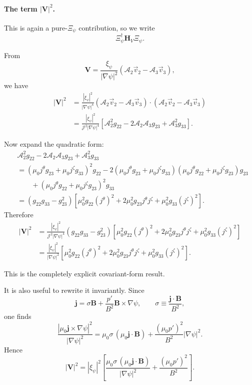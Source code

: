 \documentclass[10pt,a4paper]{article}
\numberwithin{equation}{section}
\begin{document}
\paragraph{The term $|\mathbf V|^2$.}

This is again a pure-$\Xi_\psi$ contribution, so we write
\[
\Xi_\psi^\dagger \mathbf H_V \Xi_\psi.
\]

From
\begin{equation}
\mathbf V
=
\frac{\xi_\psi}{|\nabla\psi|^2}
(\mathcal A_2\vec v_2-\mathcal A_3\vec v_3),
\end{equation}
we have
\begin{align}
|\mathbf V|^2
&=
\frac{|\xi_\psi|^2}{|\nabla\psi|^4}
(\mathcal A_2\vec v_2-\mathcal A_3\vec v_3)\cdot
(\mathcal A_2\vec v_2-\mathcal A_3\vec v_3) \\
&=
\frac{|\xi_\psi|^2}{\mathcal J^2|\nabla\psi|^4}
\left[
\mathcal A_2^2 g_{22}
-2\mathcal A_2\mathcal A_3 g_{23}
+\mathcal A_3^2 g_{33}
\right].
\end{align}

Now expand the quadratic form:
\begin{align}
&\mathcal A_2^2 g_{22}
-2\mathcal A_2\mathcal A_3 g_{23}
+\mathcal A_3^2 g_{33} \\
&=
(\mu_0j^\theta g_{23}+\mu_0j^\zeta g_{33})^2 g_{22}
-2(\mu_0j^\theta g_{23}+\mu_0j^\zeta g_{33})
(\mu_0j^\theta g_{22}+\mu_0j^\zeta g_{23})g_{23} \\
&\qquad
+(\mu_0j^\theta g_{22}+\mu_0j^\zeta g_{23})^2 g_{33} \\
&=
(g_{22}g_{33}-g_{23}^2)
\left[
\mu_0^2g_{22}(j^\theta)^2
+
2\mu_0^2g_{23}j^\theta j^\zeta
+
\mu_0^2g_{33}(j^\zeta)^2
\right].
\end{align}
Therefore
\begin{align}
|\mathbf V|^2
&=
\frac{|\xi_\psi|^2}{\mathcal J^2|\nabla\psi|^4}
(g_{22}g_{33}-g_{23}^2)
\left[
\mu_0^2g_{22}(j^\theta)^2
+
2\mu_0^2g_{23}j^\theta j^\zeta
+
\mu_0^2g_{33}(j^\zeta)^2
\right] \\
&=
\frac{|\xi_\psi|^2}{|\nabla\psi|^2}
\left[
\mu_0^2g_{22}(j^\theta)^2
+
2\mu_0^2g_{23}j^\theta j^\zeta
+
\mu_0^2g_{33}(j^\zeta)^2
\right].
\end{align}

This is the completely explicit covariant-form result.

It is also useful to rewrite it invariantly. Since
\begin{equation}
\mathbf j
=
\sigma \mathbf B
+\frac{p'}{B^2}\mathbf B\times \nabla\psi,
\qquad
\sigma\equiv \frac{\mathbf j\cdot\mathbf B}{B^2},
\end{equation}
one finds
\begin{equation}
\frac{|\mu_0\mathbf j\times\nabla\psi|^2}{|\nabla\psi|^2}
=
\mu_0\sigma\,(\mu_0\mathbf j\cdot\mathbf B)
+
\frac{(\mu_0p')^2}{B^2}|\nabla\psi|^2.
\end{equation}
Hence
\begin{equation}
\boxed{
|\mathbf V|^2
=
|\xi_\psi|^2
\left[
\frac{\mu_0\sigma\,(\mu_0\mathbf j\cdot\mathbf B)}{|\nabla\psi|^2}
+
\frac{(\mu_0p')^2}{B^2}
\right].
}
\end{equation}
\end{document}
